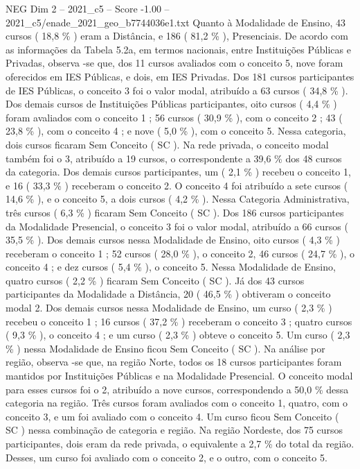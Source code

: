 \begin{textsample}{NEG Dim 2 – 2021\_c5 – Score -1.00 – 2021\_c5/enade\_2021\_geo\_b7744036e1.txt}
Quanto à Modalidade de Ensino, 43 cursos ( 18,8 \% ) eram a Distância, e 186 ( 81,2 \% ), Presenciais.
De acordo com as informações da Tabela 5.2a, em termos nacionais, entre Instituições Públicas e Privadas, observa -se que, dos 11 cursos avaliados com o conceito 5, nove foram oferecidos em IES Públicas, e dois, em IES Privadas.
Dos 181 cursos participantes de IES Públicas, o conceito 3 foi o valor modal, atribuído a 63 cursos ( 34,8 \% ).
Dos demais cursos de Instituições Públicas participantes, oito cursos ( 4,4 \% ) foram avaliados com o conceito 1 ; 56 cursos ( 30,9 \% ), com o conceito 2 ; 43 ( 23,8 \% ), com o conceito 4 ; e nove ( 5,0 \% ), com o conceito 5.
Nessa categoria, dois cursos ficaram Sem Conceito ( SC ).
Na rede privada, o conceito modal também foi o 3, atribuído a 19 cursos, o correspondente a 39,6 \% dos 48 cursos da categoria.
Dos demais cursos participantes, um ( 2,1 \% ) recebeu o conceito 1, e 16 ( 33,3 \% ) receberam o conceito 2.
O conceito 4 foi atribuído a sete cursos ( 14,6 \% ), e o conceito 5, a dois cursos ( 4,2 \% ).
Nessa Categoria Administrativa, três cursos ( 6,3 \% ) ficaram Sem Conceito ( SC ).
Dos 186 cursos participantes da Modalidade Presencial, o conceito 3 foi o valor modal, atribuído a 66 cursos ( 35,5 \% ).
Dos demais cursos nessa Modalidade de Ensino, oito cursos ( 4,3 \% ) receberam o conceito 1 ; 52 cursos ( 28,0 \% ), o conceito 2, 46 cursos ( 24,7 \% ), o conceito 4 ; e dez cursos ( 5,4 \% ), o conceito 5.
Nessa Modalidade de Ensino, quatro cursos ( 2,2 \% ) ficaram Sem Conceito ( SC ).
Já dos 43 cursos participantes da Modalidade a Distância, 20 ( 46,5 \% ) obtiveram o conceito modal 2.
Dos demais cursos nessa Modalidade de Ensino, um curso ( 2,3 \% ) recebeu o conceito 1 ; 16 cursos ( 37,2 \% ) receberam o conceito 3 ; quatro cursos ( 9,3 \% ), o conceito 4 ; e um curso ( 2,3 \% ) obteve o conceito 5.
Um curso ( 2,3 \% ) nessa Modalidade de Ensino ficou Sem Conceito ( SC ).
Na análise por região, observa -se que, na região Norte, todos os 18 cursos participantes foram mantidos por Instituições Públicas e na Modalidade Presencial.
O conceito modal para esses cursos foi o 2, atribuído a nove cursos, correspondendo a 50,0 \% dessa categoria na região.
Três cursos foram avaliados com o conceito 1, quatro, com o conceito 3, e um foi avaliado com o conceito 4.
Um curso ficou Sem Conceito ( SC ) nessa combinação de categoria e região.
Na região Nordeste, dos 75 cursos participantes, dois eram da rede privada, o equivalente a 2,7 \% do total da região.
Desses, um curso foi avaliado com o conceito 2, e o outro, com o conceito 5.

\end{textsample}
